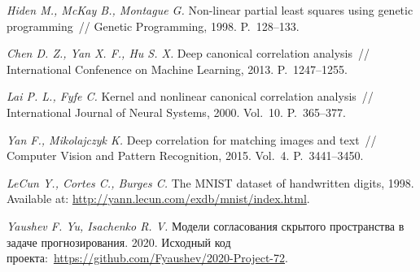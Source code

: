 \documentclass[12pt]{article}
\begin{document}
\begin{thebibliography}{99}
		\textit{Hiden M., McKay B., Montague G.} Non-linear partial least squares using genetic programming~// Genetic Programming, 1998. P.~128--133.
		
		\textit{Chen D. Z., Yan X. F., Hu S. X.} Deep canonical correlation analysis~// International Confenence on Machine Learning, 2013. P.~1247--1255.
		
		\textit{Lai P. L., Fyfe C.} Kernel and nonlinear canonical correlation analysis~// International Journal of Neural Systems, 2000. Vol.~10. P.~365--377.
		
		\textit{Yan F., Mikolajczyk K.} Deep correlation for matching images and text~// Computer Vision and Pattern Recognition, 2015. Vol.~4. P.~3441--3450.
		
		\textit{LeCun Y.,  Cortes C., Burges C.} The MNIST dataset of handwritten digits, 1998. Available at: \url{http://yann.lecun.com/exdb/mnist/index.html}.
		
		\textit{Yaushev F. Yu,  Isachenko R. V.} Модели согласования скрытого пространства в задаче прогнозирования. 2020. Исходный код проекта:~\url{https://github.com/Fyaushev/2020-Project-72}.
	\end{thebibliography}
	
\end{document}
